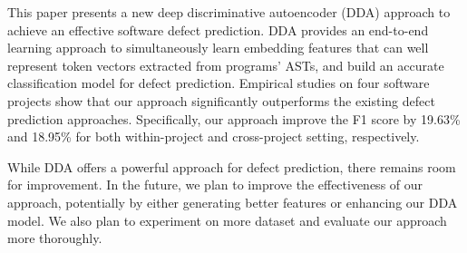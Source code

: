 
This paper presents a new deep discriminative autoencoder (DDA) approach to achieve an effective software defect prediction. DDA provides an end-to-end learning approach to simultaneously learn embedding features that can well represent token vectors extracted from programs' ASTs, and build an accurate classification model for defect prediction. Empirical studies on four software projects show that our approach significantly outperforms the existing defect prediction approaches. Specifically, our approach improve the F1 score by 19.63\% and 18.95\% 
for both within-project and cross-project setting, respectively. 

While DDA offers a powerful approach for defect prediction, there remains room for improvement. In the future, we plan to improve the effectiveness of our approach, potentially by either generating better features or enhancing our DDA model. We also plan to experiment on more dataset and evaluate our approach more thoroughly. 


%

